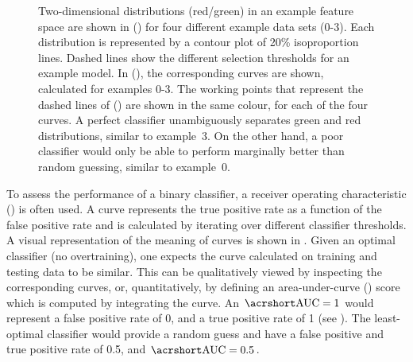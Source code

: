 \begin{figure}[htpb!]
    \centering
    \caption{\label{fig:rocs_examples}
    Two-dimensional distributions (red/green) in an example feature space are shown in () for four different example data sets (0-3).
    Each distribution is represented by a contour plot of 20\% isoproportion lines.
    Dashed lines show the different selection thresholds for an example \MVA model.
    In (), the corresponding \ROC curves are shown, calculated for examples 0-3.
    The working points that represent the dashed lines of () are shown in the same colour, for each of the four curves.
    A perfect classifier unambiguously separates green and red distributions, similar to example~3.
    On the other hand, a poor classifier would only be able to perform marginally better than random guessing, similar to example~0.    
    }
\end{figure}


To assess the performance of a binary classifier, a receiver operating characteristic (\ROC) is often used.
A \ROC curve represents the true positive rate as a function of the false positive rate and is calculated by iterating over different \MVA classifier thresholds.
A visual representation of the meaning of \ROC curves is shown in .
Given an optimal classifier (no overtraining), one expects the \ROC curve calculated on training and testing data to be similar.
This can be qualitatively viewed by inspecting the corresponding curves, or, quantitatively, by defining an area-under-curve (\AUC) score which is computed by integrating the \ROC curve.
An $\mathrm{\AUC}=1$ would represent a false positive rate of 0, and a true positive rate of 1 (see ).
The least-optimal classifier would provide a random guess and have a false positive and true positive rate of 0.5, and $\mathrm{\AUC}=0.5$.

